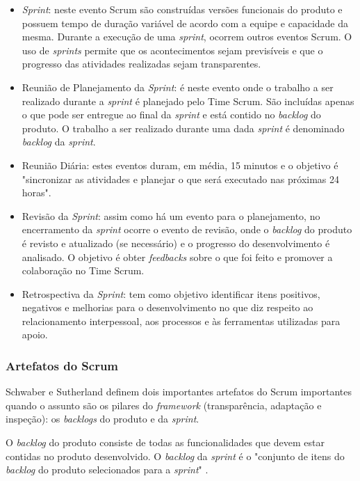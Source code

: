 \begin{itemize}
\item \textit{Sprint}: neste evento Scrum são construídas versões funcionais do produto e possuem tempo de duração variável de acordo com a equipe e capacidade da mesma. Durante a execução de uma \textit{sprint}, ocorrem outros eventos Scrum. O uso de \textit{sprints} permite que os acontecimentos sejam previsíveis e que o progresso das atividades realizadas sejam transparentes.

\item Reunião de Planejamento da \textit{Sprint}: é neste evento onde o trabalho a ser realizado durante a \textit{sprint} é planejado pelo Time Scrum. São incluídas apenas o que pode ser entregue ao final da \textit{sprint} e está contido no \textit{backlog} do produto. O trabalho a ser realizado durante uma dada \textit{sprint} é denominado \textit{backlog} da \textit{sprint}.

\item Reunião Diária: estes eventos duram, em média, 15 minutos e o objetivo é "sincronizar as atividades e planejar o que será executado nas próximas 24 horas".

\item Revisão da \textit{Sprint}: assim como há um evento para o planejamento, no encerramento da \textit{sprint} ocorre o evento de revisão, onde o \textit{backlog} do produto é revisto e atualizado (se necessário) e o progresso do desenvolvimento é analisado. O objetivo é obter \textit{feedbacks} sobre o que foi feito e promover a colaboração no Time Scrum.

\item Retrospectiva da \textit{Sprint}: tem como objetivo identificar itens positivos, negativos e melhorias para o desenvolvimento no que diz respeito ao relacionamento interpessoal, aos processos e às ferramentas utilizadas para apoio.

\end{itemize}

\subsubsection{Artefatos do Scrum}
Schwaber e Sutherland \cite{schwaber_guia_2013} definem dois importantes artefatos do Scrum importantes quando o assunto são os pilares do \textit{framework} (transparência, adaptação e inspeção): os \textit{backlogs} do produto e da \textit{sprint}. 

O \textit{backlog} do produto consiste de todas as funcionalidades que devem estar contidas no produto desenvolvido. O \textit{backlog} da \textit{sprint} é o "conjunto de itens do \textit{backlog} do produto selecionados para a \textit{sprint}" \cite{schwaber_guia_2013}.

